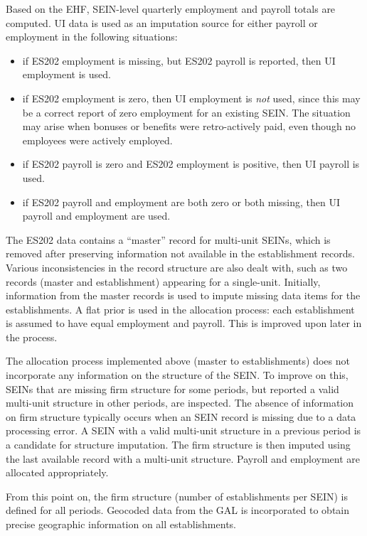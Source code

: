 Based on the EHF, SEIN-level quarterly employment and payroll totals are
computed. UI data is used as an imputation source for either payroll or
employment in the following situations:

\begin{itemize}
\item if ES202 employment is missing, but ES202 payroll is reported, then UI
employment is used. 
\item if ES202 employment is zero, then UI employment is {\em not} used,
  since this may be a correct report of zero employment for an existing
  SEIN. The situation may arise when bonuses or benefits were retro-actively paid, even
  though no employees were actively employed.
\item if ES202 payroll is zero and ES202 employment is positive, then UI
  payroll is used. 
\item if  ES202 payroll and employment are both zero or both missing, then
  UI payroll and employment are  used.
\end{itemize}

The ES202 data contains a ``master'' record for multi-unit SEINs, which is
removed after preserving information not available in the establishment
records.
Various inconsistencies in the record structure are also dealt with, such
as two records (master and establishment) appearing for a
single-unit. 
%
Initially, information from the master records is used to
impute missing data items for the establishments.  A flat prior is
used in the allocation process: each establishment is assumed to have equal
employment and payroll. This is improved upon later in the process.

The allocation process implemented above (master to establishments) does not
incorporate any information on the structure of the SEIN. To  improve on
this, SEINs that are missing firm structure for some periods, but reported a
valid multi-unit structure in other periods, are inspected. The absence of
information on firm structure typically occurs when an SEIN record is
missing due to a data processing error. A SEIN with a
valid multi-unit structure in a previous period is a candidate for
structure imputation. The  firm
structure is then imputed using the last available record with a multi-unit
structure. Payroll and employment are allocated appropriately.

From this point on, the firm structure (number of establishments per SEIN)
is defined for all periods. Geocoded data from the GAL is incorporated to
obtain precise geographic information on all establishments. 


